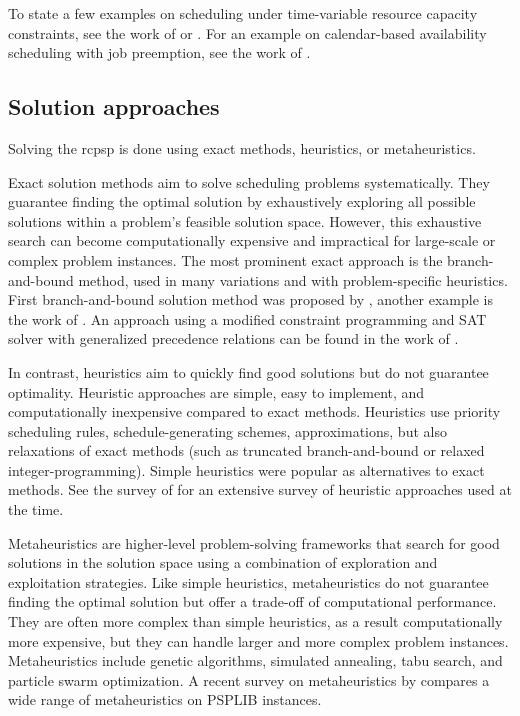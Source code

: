 To state a few examples on scheduling under time-variable resource capacity constraints,
see the work of \citet{Klein2000} or \citet{Nonobe2002}.
For an example on calendar-based availability scheduling with job preemption, see the work of \citet{Franck2001}.

\subsection{Solution approaches} \label{subsec:related-works/scheduling-the-rcpsp/solution-approaches}

Solving the \ac{rcpsp} is done using exact methods, heuristics, or metaheuristics.

Exact solution methods aim to solve scheduling problems systematically.
They guarantee finding the optimal solution by exhaustively exploring all possible solutions
within a problem's feasible solution space.
However, this exhaustive search can become computationally expensive
and impractical for large-scale or complex problem instances.
The most prominent exact approach is the branch-and-bound method,
used in many variations and with problem-specific heuristics.
First branch-and-bound solution method was proposed by \citet{Demeulemeester1992},
another example is the work of \citet{Vanhoucke2001}.
An approach using a modified constraint programming and SAT solver
with generalized precedence relations can be found in the work of \citet{Schnell2015}.

In contrast, heuristics aim to quickly find good solutions but do not guarantee optimality.
Heuristic approaches are simple, easy to implement, and computationally inexpensive compared to exact methods.
Heuristics use priority scheduling rules, schedule-generating schemes, approximations,
but also relaxations of exact methods (such as truncated branch-and-bound or relaxed integer-programming).
Simple heuristics were popular as alternatives to exact methods.
See the survey of \citet{Kolisch1999} for an extensive survey of heuristic approaches used at the time.

Metaheuristics are higher-level problem-solving frameworks that search for good solutions
in the solution space using a combination of exploration and exploitation strategies.
Like simple heuristics, metaheuristics do not guarantee finding the optimal solution
but offer a trade-off of computational performance.
They are often more complex than simple heuristics, as a result computationally more expensive,
but they can handle larger and more complex problem instances.
Metaheuristics include genetic algorithms, simulated annealing, tabu search, and particle swarm optimization.
A recent survey on metaheuristics by \citet{Pellerin2020} compares a wide range of metaheuristics
on PSPLIB instances.

